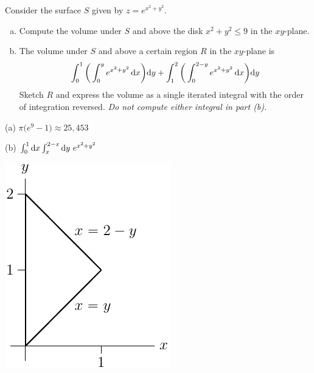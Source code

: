 \begin{question}[M200 2003A] %
Consider the surface $S$ given by $z=e^{x^2+y^2}$.
\begin{enumerate}[(a)]
\item
Compute the volume under $S$ and above the disk $x^2+y^2\le 9$ 
in the $xy$-plane.
\item
The volume under $S$ and above a certain region $R$ in the
$xy$-plane is
\begin{equation*}
\int_0^1\bigg(\int_0^y e^{x^2+y^2}\,\mathrm{d}x\bigg)\mathrm{d}y
+\int_1^2\bigg(\int_0^{2-y} e^{x^2+y^2}\,\mathrm{d}x\bigg)\mathrm{d}y
\end{equation*}
Sketch $R$ and express the volume as a single iterated integral with the
order of integration reversed. \emph{Do not compute either integral in part
(b).}
\end{enumerate}
\end{question}

%

\begin{answer}
(a) $\pi\big(e^9-1\big)\approx 25,453$

(b) $\int_0^1 \dee{x}\int_x^{2-x}\dee{y}\ e^{x^2+y^2}$
\begin{center}
     \includegraphics{fig/OE03AQ5a.pdf}
\end{center}
\end{answer}

